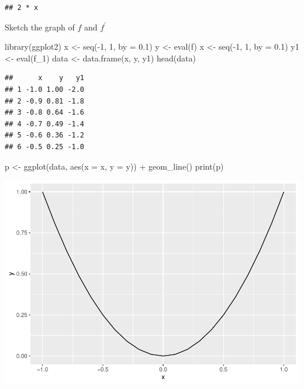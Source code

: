 \documentclass[
]{book}
\newenvironment{Shaded}{\begin{snugshade}}{\end{snugshade}}
\newcommand{\AttributeTok}[1]{\textcolor[rgb]{0.77,0.63,0.00}{#1}}
\newcommand{\DecValTok}[1]{\textcolor[rgb]{0.00,0.00,0.81}{#1}}
\newcommand{\FloatTok}[1]{\textcolor[rgb]{0.00,0.00,0.81}{#1}}
\newcommand{\FunctionTok}[1]{\textcolor[rgb]{0.00,0.00,0.00}{#1}}
\newcommand{\NormalTok}[1]{#1}
\newcommand{\OtherTok}[1]{\textcolor[rgb]{0.56,0.35,0.01}{#1}}
\newcommand{\SpecialCharTok}[1]{\textcolor[rgb]{0.00,0.00,0.00}{#1}}
\begin{document}
\begin{verbatim}
## 2 * x
\end{verbatim}

Sketch the graph of \(f\) and \(f^\prime\)

\begin{Shaded}
\begin{Highlighting}[]
\FunctionTok{library}\NormalTok{(ggplot2)}
\NormalTok{x }\OtherTok{\textless{}{-}} \FunctionTok{seq}\NormalTok{(}\SpecialCharTok{{-}}\DecValTok{1}\NormalTok{, }\DecValTok{1}\NormalTok{, }\AttributeTok{by =} \FloatTok{0.1}\NormalTok{)}
\NormalTok{y }\OtherTok{\textless{}{-}} \FunctionTok{eval}\NormalTok{(f)}
\NormalTok{x }\OtherTok{\textless{}{-}} \FunctionTok{seq}\NormalTok{(}\SpecialCharTok{{-}}\DecValTok{1}\NormalTok{, }\DecValTok{1}\NormalTok{, }\AttributeTok{by =} \FloatTok{0.1}\NormalTok{)}
\NormalTok{y1 }\OtherTok{\textless{}{-}} \FunctionTok{eval}\NormalTok{(f\_1)}
\NormalTok{data }\OtherTok{\textless{}{-}} \FunctionTok{data.frame}\NormalTok{(x, y, y1)}
\FunctionTok{head}\NormalTok{(data)}
\end{Highlighting}
\end{Shaded}

\begin{verbatim}
##      x    y   y1
## 1 -1.0 1.00 -2.0
## 2 -0.9 0.81 -1.8
## 3 -0.8 0.64 -1.6
## 4 -0.7 0.49 -1.4
## 5 -0.6 0.36 -1.2
## 6 -0.5 0.25 -1.0
\end{verbatim}

\begin{Shaded}
\begin{Highlighting}[]
\NormalTok{p }\OtherTok{\textless{}{-}} \FunctionTok{ggplot}\NormalTok{(data, }\FunctionTok{aes}\NormalTok{(}\AttributeTok{x =}\NormalTok{ x, }\AttributeTok{y =}\NormalTok{ y)) }\SpecialCharTok{+}
  \FunctionTok{geom\_line}\NormalTok{()}
\FunctionTok{print}\NormalTok{(p)}
\end{Highlighting}
\end{Shaded}

\includegraphics{bookdown-demo_files/figure-latex/unnamed-chunk-7-1.pdf}
\end{document}
